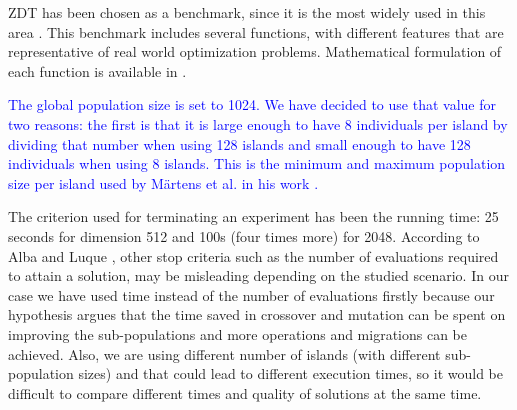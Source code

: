 \documentclass[preprint]{elsarticle}
\begin{document}
ZDT \citep{zdt2000a} has been chosen as a benchmark, since it is the most widely used in this area \citep{Deb03distributed,Martens13asynchronous,Wang09parallel,Durillo08masterslave}. This benchmark includes several functions, with different features that are representative of real world optimization problems. Mathematical formulation of each function is available in \citep{zdt2000a}. 


\textcolor{blue}{The global population size is set to 1024. We have decided to use that value for two reasons: the first is that it is large enough to have 8 individuals per island by dividing that number when using 128 islands and small enough to have 128 individuals when using 8 islands. This is the minimum and maximum population size per island used by M{\"a}rtens et al. in his work \cite{Martens13asynchronous}.}


The criterion used for terminating an experiment has been the running
time: 25 seconds for dimension 512 and 100s (four times more) for
2048. According to Alba and Luque \cite{EVALUATIONPARALLEL}, other stop criteria such as the number of evaluations required to attain a solution, may be misleading depending on the studied scenario. In our case we have used time instead of the number of evaluations firstly
because our hypothesis argues that the time saved in crossover and
mutation can be spent on improving the sub-populations and more
operations and migrations can be achieved. Also, we are using
different number of islands (with different sub-population sizes) and that
could lead to different execution times, so it would be difficult to
compare different times and quality of solutions at the same time.
\end{document}
